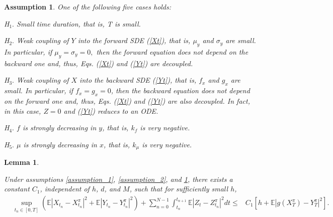 \documentclass[11pt]{article}
\newtheorem{assumption}{Assumption}
\newtheorem{lemma}{Lemma}
\begin{document}
\begin{assumption}\label{assumption_3}
One of the following five cases holds: 

H$_1.$ Small time duration, that is, T is small.

H$_2.$ Weak coupling of $Y$ into the forward SDE (\ref{Xt}), that is, $\mu_y$ and $\sigma_{y}$ are small. In particular, if $\mu_{y}=\sigma_{y}=0,$ then the forward equation does not depend on the
backward one and, thus, Eqs. (\ref{Xt}) and (\ref{Yt}) are decoupled.

H$_3.$ Weak coupling of $X$ into the backward SDE (\ref{Yt}), that is, $f_x$ and $g_x$ are small. In particular, if $f_{x}= g_{x}= 0$, then the backward equation does not depend on the forward one and, thus, Eqs. (\ref{Xt}) and (\ref{Yt}) are also decoupled. In fact, in this case, $Z=0$ and (\ref{Yt}) reduces to an ODE.

H$_4.$ $f$ is strongly decreasing in $y$, that is, $k_{f}$ is very negative. 

H$_5.$ $\mu$ is strongly decreasing in $x$, that is, $k_{\mu}$ is very negative.
\end{assumption}

\begin{lemma}\label{lemma_2}
	
Under assumptions \ref{assumption_1}, \ref{assumption_2}, and \ref{assumption_3}, there exists a constant $C_1$, independent of $h$, $d$, and $M$, such that for sufficiently small $h$,
\begin{equation}\label{lemma2}
	\begin{aligned}
		&\sup _{t_n \in[0, T]}\left(\mathbb{E}\left|X_{t_n}-{X}_{t_n}^\pi\right|^2+\mathbb{E}\left|Y_{t_n}-{Y}_{t_n}^\pi\right|^2\right)+\sum_{n=0}^{N-1}\int_{t_n}^{t_{n+1}} \mathbb{E}\left|Z_t-{Z}_{t_n}^\pi\right|^2 dt 
		\leq &C_1\left[h+\mathbb{E}\left|g\left(X_T^\pi\right)-Y_T^\pi\right|^2\right].
	\end{aligned}
\end{equation}
\end{lemma}
\end{document}

